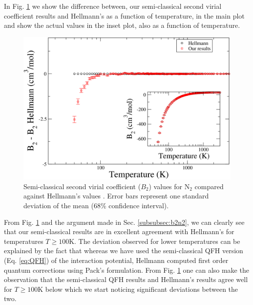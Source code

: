         In Fig. \ref{fig:B2SCN2} we show the difference between, our semi-classical second virial coefficient results and Hellmann's as a function of temperature, in the main plot and show the actual values in the inset plot, also as a function of temperature.
        \begin{figure}[!htbp]
            \centering
            \includegraphics[scale=0.20,keepaspectratio]{Chapter-5/Figures/B2SC9sResultsAll.png}
            \caption{Semi-classical second virial coefficient ($B_2$) values for N$_2$ compared against Hellmann's values \cite{Hellmann2013}. Error bars represent one standard deviation of the mean (68\% confidence interval). }
            \label{fig:B2SCN2}
        \end{figure}
        From Fig. \ref{fig:B2SCN2} and the argument made in Sec. \ref{subsubsec:b2n2}, we can clearly see that our semi-classical results are in excellent agreement with Hellmann's for temperatures $T \ge 100$K. The deviation observed for lower temperatures can be explained by the fact that whereas we have used the semi-classical QFH version (Eq. \eqref{eq:QFH}) of the interaction potential, Hellmann computed first order quantum corrections using Pack's \cite{Pack1983} formulation. From Fig. \ref{fig:B2SCN2} one can also make the observation that the semi-classical QFH results and Hellmann's results agree well for $T \ge 100$K below which we start noticing significant deviations between the two.
        \ifSCB

